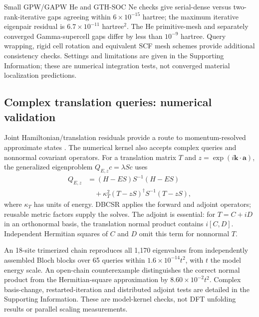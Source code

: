 Small GPW/GAPW He and GTH-SOC Ne checks give serial-dense versus
two-rank-iterative gaps agreeing within $6\times10^{-15}$ hartree;
the maximum iterative eigenpair residual is
$6.7\times10^{-11}$ hartree$^2$. The He primitive-mesh and separately
converged Gamma-supercell gaps differ by less than $10^{-9}$ hartree.
Query wrapping, rigid cell rotation and equivalent SCF mesh schemes
provide additional consistency checks. Settings and limitations
are given in the Supporting Information; these are numerical
integration tests, not converged material localization predictions.

\subsection{Complex translation queries: numerical validation}
Joint Hamiltonian/translation residuals provide a route to
momentum-resolved approximate states \cite{Bairnsfather2026}.
The numerical kernel also accepts complex queries and nonnormal
covariant operators. For a translation matrix $T$ and
$z=\exp(i\bm k\cdot\bm a)$, the generalized eigenproblem
$Q_{E,z}c=\lambda Sc$ uses
\begin{equation}
 \begin{split}
 Q_{E,z}&=(H-ES)S^{-1}(H-ES)\\
 &\quad+\kappa_T^2(T-zS)^\dagger S^{-1}(T-zS),
 \end{split}
 \label{eq:quadratic-translation}
\end{equation}
where $\kappa_T$ has units of energy. DBCSR applies the forward
and adjoint operators; reusable metric factors supply the solves.
The adjoint is essential: for $T=C+iD$ in an orthonormal basis,
the translation normal product contains $i[C,D]$. Independent
Hermitian squares of $C$ and $D$ omit this term for nonnormal $T$.

An 18-site trimerized chain reproduces all 1,170 eigenvalues
from independently assembled Bloch blocks over 65 queries
within $1.6\times10^{-14}t^2$, with $t$ the model energy scale.
An open-chain counterexample distinguishes the correct normal
product from the Hermitian-square approximation by
$8.60\times10^{-2}t^2$. Complex basis-change, restarted-iteration
and distributed adjoint tests are detailed in the Supporting
Information. These are model-kernel checks, not DFT unfolding
results or parallel scaling measurements.

